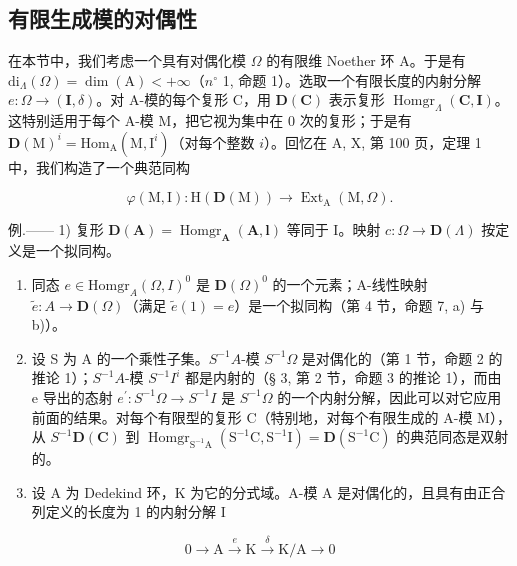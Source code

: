 \subsection{有限生成模的对偶性}

在本节中，我们考虑一个具有对偶化模 \(\Omega\) 的有限维 Noether 环 A。于是有 \(\mathrm{di}_{\Lambda}(\Omega) = \dim(\mathrm{A}) < +\infty\)（\(n^{\circ}\) 1, 命题 1）。选取一个有限长度的内射分解 \(e: \Omega \to (\mathbf{I}, \delta)\)。对 A-模的每个复形 C，用 \(\mathbf{D}(\mathbf{C})\) 表示复形 \(\operatorname{Homgr}_{\Lambda}(\mathbf{C}, \mathbf{I})\)。这特别适用于每个 A-模 M，把它视为集中在 0 次的复形；于是有 \(\mathbf{D}(\mathrm{M})^{i} = \mathrm{Hom}_{\mathrm{A}}(\mathrm{M},\mathrm{I}^{i})\)（对每个整数 \(i\)）。回忆在 A, X, 第 100 页，定理 1 中，我们构造了一个典范同构

\[
\varphi (\mathrm{M}, \mathrm{I}): \mathrm{H} (\mathbf {D} (\mathrm{M})) \longrightarrow \operatorname{Ext} _ {\mathrm{A}} (\mathrm{M}, \Omega).
\]

例.—— 1) 复形 \(\mathbf{D}(\mathbf{A}) = \operatorname{Homgr}_{\mathbf{A}}(\mathbf{A},\mathbf{l})\) 等同于 I。映射 \(c:\Omega \to \mathbf{D}(\Lambda)\) 按定义是一个拟同构。

\begin{enumerate}
\def\labelenumi{\arabic{enumi})}
\setcounter{enumi}{1}
\item
  同态 \(e \in \text{Homgr}_A(\Omega, I)^0\) 是 \(\mathbf{D}(\Omega)^0\) 的一个元素；A-线性映射 \(\tilde{e}: A \to \mathbf{D}(\Omega)\)（满足 \(\tilde{e}(1) = e\)）是一个拟同构（第 4 节，命题 7, a) 与 b)）。
\item
  设 S 为 A 的一个乘性子集。\(S^{-1}A\)-模 \(S^{-1}\Omega\) 是对偶化的（第 1 节，命题 2 的推论 1）；\(S^{-1}A\)-模 \(S^{-1}I^{i}\) 都是内射的（§ 3, 第 2 节，命题 3 的推论 1），而由 e 导出的态射 \(e^{\prime}:S^{-1}\Omega\to S^{-1}I\) 是 \(S^{-1}\Omega\) 的一个内射分解，因此可以对它应用前面的结果。对每个有限型的复形 C（特别地，对每个有限生成的 A-模 M），从 \(S^{-1}\mathbf{D}(\mathbf{C})\) 到 \(\operatorname{Homgr}_{\mathrm{S}^{-1}\mathrm{A}}(\mathrm{S}^{-1}\mathrm{C},\mathrm{S}^{-1}\mathrm{I})=\mathbf{D}(\mathrm{S}^{-1}\mathrm{C})\) 的典范同态是双射的。
\item
  设 A 为 Dedekind 环，K 为它的分式域。A-模 A 是对偶化的，且具有由正合列定义的长度为 1 的内射分解 I
\end{enumerate}

\[
0 \to \mathrm{A} \stackrel {e} {\longrightarrow} \mathrm{K} \stackrel {\delta} {\longrightarrow} \mathrm{K/A} \to 0
\]

